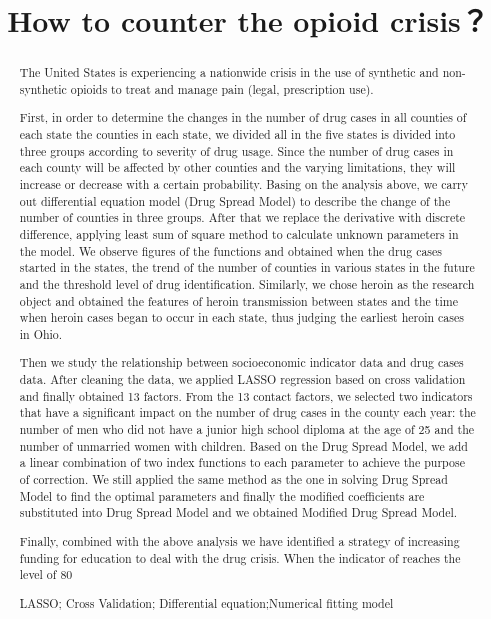 \documentclass{mcmthesis}
\title{How to counter the opioid crisis？}
\author{
  }
\begin{document}
\begin{abstract}
The United States is experiencing a nationwide crisis in the use of synthetic and non-synthetic opioids to treat and manage pain (legal, prescription use).

First, in order to determine the changes in the number of drug cases in all counties of each state the counties in each state, we divided all in the five states is divided into three groups according to severity of drug usage. Since the number of drug cases in each county will be affected by other counties and the varying limitations, they will increase or decrease with a certain probability. Basing on the analysis above, we carry out differential equation model (Drug Spread Model) to describe the change of the number of counties in three groups. After that we replace the derivative with discrete difference, applying least sum of square method to calculate unknown parameters in the model. We observe figures of the functions and obtained when the drug cases started in the states, the trend of the number of counties in various states in the future and the threshold level of drug identification. Similarly, we chose heroin as the research object and obtained the features of heroin transmission between states and the time when heroin cases began to occur in each state, thus judging the earliest heroin cases in Ohio. 

Then we study the relationship between socioeconomic indicator data and drug cases data.  After cleaning the data, we applied LASSO regression based on cross validation and finally obtained 13 factors. From the 13 contact factors, we selected two indicators that have a significant impact on the number of drug cases in the county each year: the number of men who did not have a junior high school diploma at the age of 25 and the number of unmarried women with children. Based on the Drug Spread Model, we add a linear combination of two index functions to each parameter to achieve the purpose of correction. We still applied the same method as the one in solving Drug Spread Model to find the optimal parameters and finally the modified coefficients are substituted into Drug Spread Model and we obtained Modified Drug Spread Model.

Finally, combined with the above analysis we have identified a strategy of increasing funding for education to deal with the drug crisis. When the indicator of reaches the level of 80%
\begin{keywords}
LASSO; Cross Validation; Differential equation;Numerical fitting model
\end{keywords}
\end{abstract}
\maketitle
\end{document}
